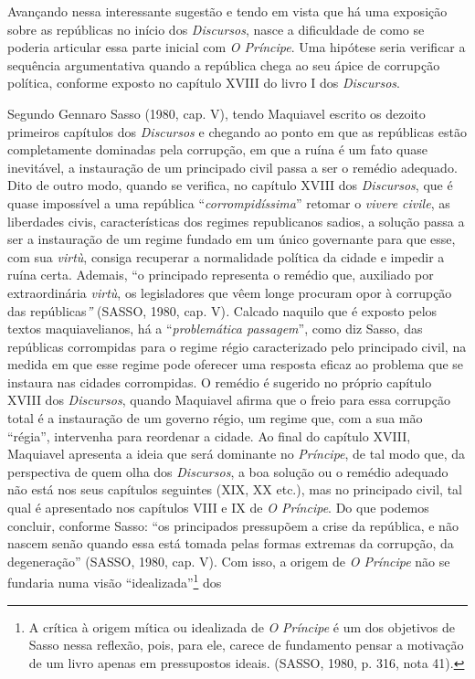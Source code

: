 Avançando nessa interessante sugestão e tendo em vista que há uma
exposição sobre as repúblicas no início dos \emph{Discursos}, nasce a
dificuldade de como se poderia articular essa parte inicial com \emph{O
Príncipe}. Uma hipótese seria verificar a sequência argumentativa quando
a república chega ao seu ápice de corrupção política, conforme exposto
no capítulo XVIII do livro I dos \emph{Discursos}.

Segundo Gennaro Sasso (1980, cap. V), tendo Maquiavel escrito os dezoito
primeiros capítulos dos \emph{Discursos} e chegando ao ponto em que as
repúblicas estão completamente dominadas pela corrupção, em que a ruína
é um fato quase inevitável, a instauração de um principado civil passa a
ser o remédio adequado. Dito de outro modo, quando se verifica, no
capítulo XVIII dos \emph{Discursos}, que é quase impossível a uma
república ``\emph{corrompidíssima}'' retomar o \emph{vivere civile}, as
liberdades civis, características dos regimes republicanos sadios, a
solução passa a ser a instauração de um regime fundado em um único
governante para que esse, com sua \emph{virtù}, consiga recuperar a
normalidade política da cidade e impedir a ruína certa. Ademais, ``o
principado representa o remédio que, auxiliado por extraordinária
\emph{virtù}, os legisladores que vêem longe procuram opor à corrupção
das repúblicas\emph{''} (SASSO, 1980, cap. V)\emph{.} Calcado naquilo
que é exposto pelos textos maquiavelianos, há a ``\emph{problemática
passagem}'', como diz Sasso, das repúblicas corrompidas para o regime
régio caracterizado pelo principado civil, na medida em que esse regime
pode oferecer uma resposta eficaz ao problema que se instaura nas
cidades corrompidas. O remédio é sugerido no próprio capítulo XVIII dos
\emph{Discursos}, quando Maquiavel afirma que o freio para essa
corrupção total é a instauração de um governo régio, um regime que, com
a sua mão ``régia'', intervenha para reordenar a cidade. Ao final do
capítulo XVIII, Maquiavel apresenta a ideia que será dominante no
\emph{Príncipe}, de tal modo que, da perspectiva de quem olha dos
\emph{Discursos}, a boa solução ou o remédio adequado não está nos seus
capítulos seguintes (XIX, XX etc.), mas no principado civil, tal qual é
apresentado nos capítulos VIII e IX de \emph{O Príncipe}. Do que podemos
concluir, conforme Sasso: ``os principados pressupõem a crise da
república, e não nascem senão quando essa está tomada pelas formas
extremas da corrupção, da degeneração'' (SASSO, 1980, cap. V). Com isso,
a origem de \emph{O Príncipe} não se fundaria numa visão
``idealizada''\footnote{A crítica à origem mítica ou idealizada de
  \emph{O} \emph{Príncipe} é um dos objetivos de Sasso nessa reflexão,
  pois, para ele, carece de fundamento pensar a motivação de um livro
  apenas em pressupostos ideais. (SASSO, 1980, p. 316, nota 41).} dos
